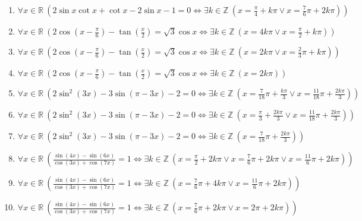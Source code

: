 \documentclass[11pt,a4paper]{article}
\begin{document}
\begin{enumerate}
\item $\displaystyle \forall x \in \mathbb{R}\ \left( 2\sin x \cot x + \cot x - 2\sin x - 1 = 0 \iff \exists k \in \mathbb{Z}\ \left( x = \frac{\pi}{4} + k\pi \lor x = \frac{7}{6}\pi + 2k\pi \right) \right)$
\item $\displaystyle \forall x \in \mathbb{R}\ \left( 2\cos\left(x - \frac{\pi}{6}\right) - \tan\left(\frac{x}{2}\right) = \sqrt{3}\cos x \iff \exists k \in \mathbb{Z}\ \left( x = 4k\pi \lor x = \frac{\pi}{2} + k\pi \right) \right)$
\item $\displaystyle \forall x \in \mathbb{R}\ \left( 2\cos\left(x - \frac{\pi}{6}\right) - \tan\left(\frac{x}{2}\right) = \sqrt{3}\cos x \iff \exists k \in \mathbb{Z}\ \left( x = 2k\pi \lor x = \frac{2}{3}\pi + k\pi \right) \right)$
\item $\displaystyle \forall x \in \mathbb{R}\ \left( 2\cos\left(x - \frac{\pi}{6}\right) - \tan\left(\frac{x}{2}\right) = \sqrt{3}\cos x \iff \exists k \in \mathbb{Z}\ \left( x = 2k\pi \right) \right)$
\item $\displaystyle \forall x \in \mathbb{R}\ \left( 2\sin^{2}\left(3x\right) - 3\sin\left(\pi - 3x\right) - 2 = 0 \iff \exists k \in \mathbb{Z}\ \left( x = \frac{7}{18}\pi + \frac{k\pi}{3} \lor x = \frac{11}{18}\pi + \frac{2k\pi}{3} \right) \right)$
\item $\displaystyle \forall x \in \mathbb{R}\ \left( 2\sin^{2}\left(3x\right) - 3\sin\left(\pi - 3x\right) - 2 = 0 \iff \exists k \in \mathbb{Z}\ \left( x = \frac{\pi}{3} + \frac{2k\pi}{3} \lor x = \frac{11}{18}\pi + \frac{2k\pi}{3} \right) \right)$
\item $\displaystyle \forall x \in \mathbb{R}\ \left( 2\sin^{2}\left(3x\right) - 3\sin\left(\pi - 3x\right) - 2 = 0 \iff \exists k \in \mathbb{Z}\ \left( x = \frac{7}{18}\pi + \frac{2k\pi}{3} \right) \right)$
\item $\displaystyle \forall x \in \mathbb{R}\ \left( \frac{\sin\left(4x\right) - \sin\left(6x\right)}{\cos\left(3x\right) + \cos\left(7x\right)} = 1 \iff \exists k \in \mathbb{Z}\ \left( x = \frac{\pi}{2} + 2k\pi \lor x = \frac{7}{6}\pi + 2k\pi \lor x = \frac{11}{6}\pi + 2k\pi \right) \right)$
\item $\displaystyle \forall x \in \mathbb{R}\ \left( \frac{\sin\left(4x\right) - \sin\left(6x\right)}{\cos\left(3x\right) + \cos\left(7x\right)} = 1 \iff \exists k \in \mathbb{Z}\ \left( x = \frac{7}{6}\pi + 4k\pi \lor x = \frac{11}{6}\pi + 2k\pi \right) \right)$
\item $\displaystyle \forall x \in \mathbb{R}\ \left( \frac{\sin\left(4x\right) - \sin\left(6x\right)}{\cos\left(3x\right) + \cos\left(7x\right)} = 1 \iff \exists k \in \mathbb{Z}\ \left( x = \frac{7}{6}\pi + 2k\pi \lor x = 2\pi + 2k\pi \right) \right)$

\end{enumerate}
\end{document}
